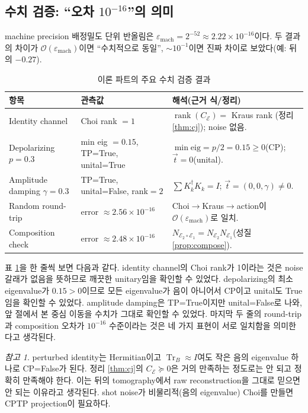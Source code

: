 \documentclass[11pt,a4paper]{article}
\newcommand{\E}{\mathcal{E}}
\newcommand{\Tr}{\operatorname{Tr}}
\newcommand{\rank}{\operatorname{rank}}
\theoremstyle{definition}
\theoremstyle{plain}
\theoremstyle{remark}
\newtheorem*{remark}{참고}
\begin{document}
\subsection{수치 검증: ``오차 $10^{-16}$''의 의미}

\begin{mathbox}{machine precision}
배정밀도 단위 반올림은 $\varepsilon_{\mathrm{mach}}=2^{-52}\approx2.22\times10^{-16}$이다. 두 결과의 차이가 $\mathcal O(\varepsilon_{\mathrm{mach}})$이면 ``수치적으로 동일'', $\sim10^{-1}$이면 진짜 차이로 보았다(예: 뒤의 $-0.27$).
\end{mathbox}

\begin{table}[H]
\centering\small
\caption{이론 파트의 주요 수치 검증 결과}
\label{tab:theory-results}
\begin{tabularx}{\textwidth}{p{}p{}X}
\toprule
항목 & 관측값 & 해석(근거 식/정리) \\
\midrule
Identity channel & Choi rank $=1$ & $\rank(C_\E)=$ Kraus rank (정리 \ref{thm:cj}); noise 없음. \\
Depolarizing $p=0.3$ & min eig $=0.15$, TP=True, unital=True & $\min\mathrm{eig}=p/2=0.15\ge0$(CP); $\vec t=0$(unital). \\
Amplitude damping $\gamma=0.3$ & TP=True, unital=False, rank$=2$ & $\sum K_k^\dagger K_k=I$; $\vec t=(0,0,\gamma)\neq0$. \\
Random round-trip & error $\approx2.56\times10^{-16}$ & Choi$\to$Kraus$\to$action이 $\mathcal O(\varepsilon_{\mathrm{mach}})$로 일치. \\
Composition check & error $\approx2.48\times10^{-16}$ & $N_{\E_2\circ\E_1}=N_{\E_2}N_{\E_1}$(성질 \ref{prop:compose}). \\
\bottomrule
\end{tabularx}
\end{table}

표 \ref{tab:theory-results}을 한 줄씩 보면 다음과 같다. identity channel의 Choi rank가 1이라는 것은 noise 갈래가 없음을 뜻하므로 깨끗한 unitary임을 확인할 수 있었다. depolarizing의 최소 eigenvalue가 $0.15>0$이므로 모든 eigenvalue가 음이 아니어서 CP이고 unital도 True임을 확인할 수 있었다. amplitude damping은 TP=True이지만 unital=False로 나와, 앞 절에서 본 중심 이동을 수치가 그대로 확인할 수 있었다. 마지막 두 줄의 round-trip과 composition 오차가 $10^{-16}$ 수준이라는 것은 네 가지 표현이 서로 일치함을 의미한다고 생각된다.

\begin{remark}
perturbed identity는 Hermitian이고 $\Tr_B\approx I$여도 작은 음의 eigenvalue 하나로 CP=False가 된다. 정리 \ref{thm:cj}의 $C_\E\succeq0$은 거의 만족하는 정도로는 안 되고 정확히 만족해야 한다. 이는 뒤의 tomography에서 raw reconstruction을 그대로 믿으면 안 되는 이유라고 생각된다. shot noise가 비물리적(음의 eigenvalue) Choi를 만들면 CPTP projection이 필요하다.
\end{remark}
\end{document}
